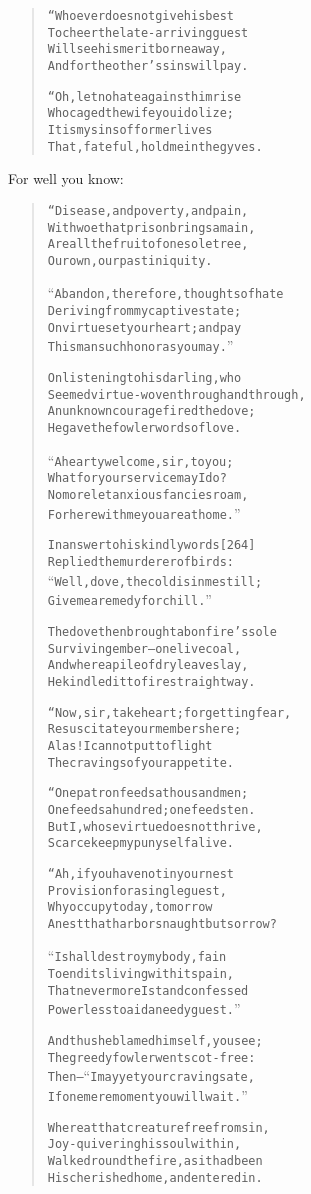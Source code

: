 \documentclass[article, twoside, 14pt]{memoir}
\renewenvironment{verbatim}{%
\begin{quote}%
\vskip -10pt%
\begin{alltt}\normalfont\large}{\end{alltt}%
\end{quote}%
\vskip -10pt
} %
\begin{document}
\begin{verbatim}
“Whoever does not give his best
To cheer the late-arriving guest
Will see his merit borne away,
And for the other's sins will pay.

“Oh, let no hate against him rise
Who caged the wife you idolize;
It is my sins of former lives
That, fateful, hold me in the gyves.
\end{verbatim}
For well you know:

\begin{verbatim}
“Disease, and poverty, and pain,
With woe that prison brings amain,
Are all the fruit of one sole tree,
Our own, our past iniquity.

“Abandon, therefore, thoughts of hate
Deriving from my captive state;
On virtue set your heart; and pay
This man such honor as you may.”

On listening to his darling, who
Seemed virtue-woven through and through,
An unknown courage fired the dove;
He gave the fowler words of love.

“A hearty welcome, sir, to you;
What for your service may I do?
No more let anxious fancies roam,
For here with me you are at home.”

In answer to his kindly words                           [264]
Replied the murderer of birds:
“Well, dove, the cold is in me still;
Give me a remedy for chill.”

The dove then brought a bonfire's sole
Surviving ember--one live coal,
And where a pile of dry leaves lay,
He kindled it to fire straightway.

“Now, sir, take heart; forgetting fear,
Resuscitate your members here;
Alas! I cannot put to flight
The cravings of your appetite.

“One patron feeds a thousand men;
One feeds a hundred; one feeds ten.
But I, whose virtue does not thrive,
Scarce keep my puny self alive.

“Ah, if you have not in your nest
Provision for a single guest,
Why occupy today, tomorrow
A nest that harbors naught but sorrow?

“I shall destroy my body, fain
To end its living with its pain,
That nevermore I stand confessed
Powerless to aid a needy guest.”

And thus he blamed himself, you see;
The greedy fowler went scot-free:
Then--“I may yet your craving sate,
If one mere moment you will wait.”

Whereat that creature free from sin,
Joy-quivering his soul within,
Walked round the fire, as it had been
His cherished home, and entered in.


\end{verbatim}
\end{document}
